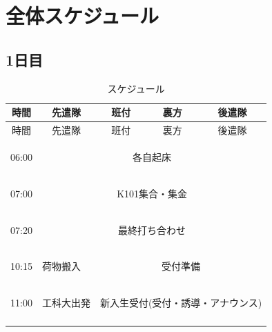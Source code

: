 \chapter{全体スケジュール}

\section{1日目}
\begin{longtable}[c]{|p{}|p{}|p{}|p{}|p{}|}
  \caption{スケジュール} \\
  \hline
  \multicolumn{1}{|c|}{時間} & \multicolumn{1}{c|}{先遣隊} & \multicolumn{1}{c|}{班付} & \multicolumn{1}{c|}{裏方} & \multicolumn{1}{c|}{後遣隊} \\
  \hline
  \endfirsthead
  
  \hline
  \multicolumn{1}{|c|}{時間} & \multicolumn{1}{c|}{先遣隊} & \multicolumn{1}{c|}{班付} & \multicolumn{1}{c|}{裏方} & \multicolumn{1}{c|}{後遣隊} \\
  \hline
  \endhead
  
  \hline
  \endfoot
  
  \hline
  \endlastfoot
  
  \begin{tpacol}
    06:00
  \end{tpacol}&
  \multicolumn{4}{c|}{各自起床} \\
  \hdashline

  \begin{tpacol}
    07:00
  \end{tpacol}&
  \multicolumn{4}{c|}{K101集合・集金} \\
  \hdashline

  \begin{tpacol}
    07:20
  \end{tpacol}&
  \multicolumn{4}{c|}{最終打ち合わせ} \\
  \hdashline

  \begin{tpacol}
    10:15
  \end{tpacol}&
  \begin{tpbcol}
    荷物搬入
  \end{tpbcol}&
  \multicolumn{3}{c|}{受付準備}\\
  \hdashline

  \begin{tpacol}
    11:00
  \end{tpacol}&
  \begin{tpbcol}
    工科大出発
  \end{tpbcol}&
  \multicolumn{3}{c|}{新入生受付(受付・誘導・アナウンス)}\\
  \hdashline


\end{longtable}
